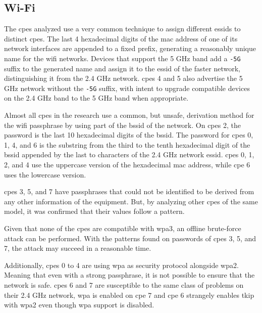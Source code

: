 \subsection{Wi-Fi}

The \glspl{cpe} analyzed use a very common technique to assign different \glspl{essid} to distinct \gls{cpe}s. The last 4 hexadecimal digits of the \gls{mac} address of one of its network interfaces are appended to a fixed prefix, generating a reasonably unique name for the \gls{wifi} networks. Devices that support the 5 \gls{G}\gls{Hz} band add a \texttt{-5G} suffix to the generated name and assign it to the \gls{essid} of the faster network, distinguishing it from the 2.4 \gls{G}\gls{Hz} network. \glspl{cpe} 4 and 5 also advertise the 5 \gls{G}\gls{Hz} network without the \texttt{-5G} suffix, with intent to upgrade compatible devices on the 2.4 \gls{G}\gls{Hz} band to the 5 \gls{G}\gls{Hz} band when appropriate.

Almost all \glspl{cpe} in the research use a common, but unsafe, derivation method for the \gls{wifi} passphrase by using part of the \gls{bssid} of the network. On \glspl{cpe} 2, the password is the last 10 hexadecimal digits of the \gls{bssid}. The password for \glspl{cpe} 0, 1, 4, and 6 is the substring from the third to the tenth hexadecimal digit of the \gls{bssid} appended by the last to characters of the 2.4 \gls{G}\gls{Hz} network \gls{essid}. \glspl{cpe} 0, 1, 2, and 4 use the uppercase version of the hexadecimal \gls{mac} address, while \gls{cpe} 6 uses the lowercase version.

\glspl{cpe} 3, 5, and 7 have passphrases that could not be identified to be derived from any other information of the equipment. But, by analyzing other \glspl{cpe} of the same model, it was confirmed that their values follow a pattern.

Given that none of the \glspl{cpe} are compatible with \gls{wpa}3, an offline brute-force attack can be performed. With the patterns found on passwords of \glspl{cpe} 3, 5, and 7, the attack may succeed in a reasonable time.

Additionally, \glspl{cpe} 0 to 4 are using \gls{wpa} as security protocol alongside \gls{wpa}2. Meaning that even with a strong passphrase, it is not possible to ensure that the network is safe. \glspl{cpe} 6 and 7 are susceptible to the same class of problems on their 2.4 \gls{G}\gls{Hz} network, \gls{wpa} is enabled on \gls{cpe} 7 and \gls{cpe} 6 strangely enables \gls{tkip} with \gls{wpa}2 even though \gls{wpa} support is disabled.

